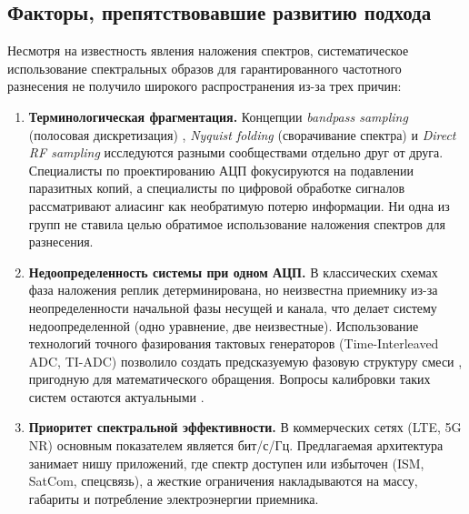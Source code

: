 \documentclass[a4paper,12pt]{article}
\numberwithin{equation}{section}
\begin{document}
\subsection{Факторы, препятствовавшие развитию подхода}
Несмотря на известность явления наложения спектров, систематическое использование спектральных образов для гарантированного частотного разнесения не получило широкого распространения из-за трех причин:

\begin{enumerate}
    \item \textbf{Терминологическая фрагментация.} Концепции \textit{bandpass sampling} (полосовая дискретизация) \cite{vaughan,harris,rajasekaran}, \textit{Nyquist folding} (сворачивание спектра) \cite{fudge,murray} и \textit{Direct RF sampling} исследуются разными сообществами отдельно друг от друга. Специалисты по проектированию АЦП фокусируются на подавлении паразитных копий, а специалисты по цифровой обработке сигналов рассматривают алиасинг как необратимую потерю информации. Ни одна из групп не ставила целью обратимое использование наложения спектров для разнесения.
    
    \item \textbf{Недоопределенность системы при одном АЦП.} В классических схемах фаза наложения реплик детерминирована, но неизвестна приемнику из-за неопределенности начальной фазы несущей и канала, что делает систему недоопределенной (одно уравнение, две неизвестные). Использование технологий точного фазирования тактовых генераторов (Time-Interleaved ADC, TI-ADC) позволило создать предсказуемую фазовую структуру смеси \cite{walden,tsai,rajeswaran}, пригодную для математического обращения. Вопросы калибровки таких систем остаются актуальными \cite{elbornsson}.
    
    \item \textbf{Приоритет спектральной эффективности.} В коммерческих сетях (LTE, 5G NR) основным показателем является бит/с/Гц. Предлагаемая архитектура занимает нишу приложений, где спектр доступен или избыточен (ISM, SatCom, спецсвязь), а жесткие ограничения накладываются на массу, габариты и потребление электроэнергии приемника.
\end{enumerate}
\end{document}
